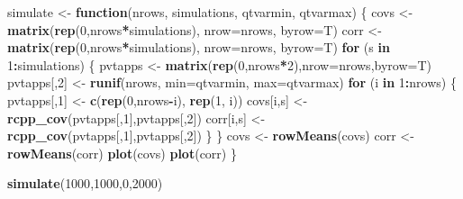\documentclass[]{article}
\newenvironment{Shaded}{\begin{snugshade}}{\end{snugshade}}
\newcommand{\ControlFlowTok}[1]{\textcolor[rgb]{0.13,0.29,0.53}{\textbf{#1}}}
\newcommand{\DataTypeTok}[1]{\textcolor[rgb]{0.13,0.29,0.53}{#1}}
\newcommand{\DecValTok}[1]{\textcolor[rgb]{0.00,0.00,0.81}{#1}}
\newcommand{\KeywordTok}[1]{\textcolor[rgb]{0.13,0.29,0.53}{\textbf{#1}}}
\newcommand{\NormalTok}[1]{#1}
\newcommand{\OperatorTok}[1]{\textcolor[rgb]{0.81,0.36,0.00}{\textbf{#1}}}
\newcommand{\StringTok}[1]{\textcolor[rgb]{0.31,0.60,0.02}{#1}}
\begin{document}
\begin{Shaded}
\begin{Highlighting}[]
\NormalTok{simulate <-}\StringTok{ }\ControlFlowTok{function}\NormalTok{(nrows, simulations, qtvarmin, qtvarmax) \{}
\NormalTok{    covs <-}\StringTok{ }\KeywordTok{matrix}\NormalTok{(}\KeywordTok{rep}\NormalTok{(}\DecValTok{0}\NormalTok{,nrows}\OperatorTok{*}\NormalTok{simulations), }\DataTypeTok{nrow=}\NormalTok{nrows, }\DataTypeTok{byrow=}\NormalTok{T)}
\NormalTok{    corr <-}\StringTok{ }\KeywordTok{matrix}\NormalTok{(}\KeywordTok{rep}\NormalTok{(}\DecValTok{0}\NormalTok{,nrows}\OperatorTok{*}\NormalTok{simulations), }\DataTypeTok{nrow=}\NormalTok{nrows, }\DataTypeTok{byrow=}\NormalTok{T)}
    \ControlFlowTok{for}\NormalTok{ (s }\ControlFlowTok{in} \DecValTok{1}\OperatorTok{:}\NormalTok{simulations) \{}
\NormalTok{        pvtapps <-}\StringTok{ }\KeywordTok{matrix}\NormalTok{(}\KeywordTok{rep}\NormalTok{(}\DecValTok{0}\NormalTok{,nrows}\OperatorTok{*}\DecValTok{2}\NormalTok{),}\DataTypeTok{nrow=}\NormalTok{nrows,}\DataTypeTok{byrow=}\NormalTok{T)}
\NormalTok{        pvtapps[,}\DecValTok{2}\NormalTok{] <-}\StringTok{ }\KeywordTok{runif}\NormalTok{(nrows, }\DataTypeTok{min=}\NormalTok{qtvarmin, }\DataTypeTok{max=}\NormalTok{qtvarmax)}
        \ControlFlowTok{for}\NormalTok{ (i }\ControlFlowTok{in} \DecValTok{1}\OperatorTok{:}\NormalTok{nrows) \{}
\NormalTok{            pvtapps[,}\DecValTok{1}\NormalTok{] <-}\StringTok{ }\KeywordTok{c}\NormalTok{(}\KeywordTok{rep}\NormalTok{(}\DecValTok{0}\NormalTok{,nrows}\OperatorTok{-}\NormalTok{i), }\KeywordTok{rep}\NormalTok{(}\DecValTok{1}\NormalTok{, i))}
\NormalTok{            covs[i,s] <-}\StringTok{ }\KeywordTok{rcpp_cov}\NormalTok{(pvtapps[,}\DecValTok{1}\NormalTok{],pvtapps[,}\DecValTok{2}\NormalTok{])}
\NormalTok{            corr[i,s] <-}\StringTok{ }\KeywordTok{rcpp_cov}\NormalTok{(pvtapps[,}\DecValTok{1}\NormalTok{],pvtapps[,}\DecValTok{2}\NormalTok{])}
\NormalTok{        \}}
\NormalTok{    \}}
\NormalTok{    covs <-}\StringTok{ }\KeywordTok{rowMeans}\NormalTok{(covs)}
\NormalTok{    corr <-}\StringTok{ }\KeywordTok{rowMeans}\NormalTok{(corr)}
    \KeywordTok{plot}\NormalTok{(covs)}
    \KeywordTok{plot}\NormalTok{(corr)}
\NormalTok{\}}
\end{Highlighting}
\end{Shaded}

\begin{Shaded}
\begin{Highlighting}[]
\KeywordTok{simulate}\NormalTok{(}\DecValTok{1000}\NormalTok{,}\DecValTok{1000}\NormalTok{,}\DecValTok{0}\NormalTok{,}\DecValTok{2000}\NormalTok{)}
\end{Highlighting}
\end{Shaded}
\end{document}

